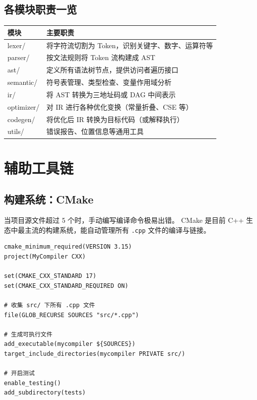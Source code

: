 \documentclass[12pt, a4paper]{ctexart}
\begin{document}
\subsection{各模块职责一览}

\begin{center}
\renewcommand{\arraystretch}{1.4}
\begin{tabular}{>{\ttfamily\small}l p{9cm}}
\toprule
\normalfont\bfseries 模块 & \bfseries 主要职责 \\
\midrule
lexer/     & 将字符流切割为 Token，识别关键字、数字、运算符等 \\
parser/    & 按文法规则将 Token 流构建成 AST \\
ast/       & 定义所有语法树节点，提供访问者遍历接口 \\
semantic/  & 符号表管理、类型检查、变量作用域分析 \\
ir/        & 将 AST 转换为三地址码或 DAG 中间表示 \\
optimizer/ & 对 IR 进行各种优化变换（常量折叠、CSE 等） \\
codegen/   & 将优化后 IR 转换为目标代码（或解释执行） \\
utils/     & 错误报告、位置信息等通用工具 \\
\bottomrule
\end{tabular}
\end{center}

\section{辅助工具链}

\subsection{构建系统：CMake}

当项目源文件超过 5 个时，手动编写编译命令极易出错。
CMake 是目前 C++ 生态中最主流的构建系统，能自动管理所有 \texttt{.cpp} 文件的编译与链接。

\begin{lstlisting}[caption={顶层 CMakeLists.txt 示例}]
cmake_minimum_required(VERSION 3.15)
project(MyCompiler CXX)

set(CMAKE_CXX_STANDARD 17)
set(CMAKE_CXX_STANDARD_REQUIRED ON)

# 收集 src/ 下所有 .cpp 文件
file(GLOB_RECURSE SOURCES "src/*.cpp")

# 生成可执行文件
add_executable(mycompiler ${SOURCES})
target_include_directories(mycompiler PRIVATE src/)

# 开启测试
enable_testing()
add_subdirectory(tests)
\end{lstlisting}
\end{document}
